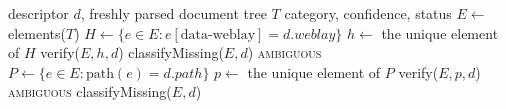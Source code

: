 \documentclass[conference]{IEEEtran}
\begin{document}
\begin{algorithm}
\renewcommand{\algorithmicrequire}{\textbf{Input:}}
\renewcommand{\algorithmicensure}{\textbf{Output:}}
\begin{algorithmic}[1]
\REQUIRE descriptor $d$, freshly parsed document tree $T$
\ENSURE  category, confidence, status
\STATE $E \leftarrow$ elements($T$)
  \STATE $H \leftarrow \{e \in E : e[\text{data-weblay}] = d.\mathit{weblay}\}$
    \STATE $h \leftarrow$ the unique element of $H$
    \RETURN verify($E,h,d$)
    \RETURN classifyMissing($E,d$)
  \ELSE
    \RETURN \textsc{ambiguous} 
  \ENDIF
\ENDIF
\STATE $P \leftarrow \{e \in E : \text{path}(e) = d.\mathit{path}\}$
  \STATE $p \leftarrow$ the unique element of $P$
  \RETURN verify($E,p,d$)
  \RETURN \textsc{ambiguous}
\ELSE
  \RETURN classifyMissing($E,d$)
\ENDIF
\end{algorithmic}
\caption{Descriptor re-resolution (server-side).}
\label{alg:resolve}
\end{algorithm}
\end{document}
